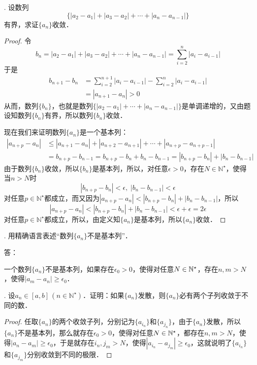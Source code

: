 . 设数列
\begin{equation}
    \{|a_2-a_1|+|a_3-a_2|+\cdots+|a_n-a_{n-1}|\}
\end{equation}
有界，求证$\{a_n\}$收敛．
\begin{proof}
令
\begin{equation}
    b_n = |a_2-a_1|+|a_3-a_2|+\cdots+|a_n-a_{n-1}| =\sum_{i=2}^n |a_{i}-a_{i-1}|
\end{equation}
于是
\begin{align}
    b_{n+1}-b_n &= \sum_{i=2}^{n+1} |a_i - a_{i-1}| -\sum_{i=2}^{n} |a_i-a_{i-1}| \\
    &= |a_{n+1}-a_{n}| > 0
\end{align}
从而，数列$\{b_n\}$，也就是数列$\{|a_2-a_1|+\cdots+|a_{n}-a_{n-1}|\}$是单调递增的，又由题设知数列$\{b_n\}$有界，所以数列$\{b_n\}$收敛．

\noindent 现在我们来证明数列$\{a_n\}$是一个基本列：
\begin{align}
    |a_{n+p}-a_n| &\leq |a_{n+1}-a_n|+|a_{n+2}-a_{n+1}|+\cdots+|a_{n+p}-a_{n+p-1}| \\
    &= b_{n+p} - b_{n-1} = b_{n+p} - b_n + b_{n} - b_{n-1} = |b_{n+p}-b_n|+|b_n-b_{n-1}|
\end{align}
由于数列$\{b_n\}$收敛，所以$\{b_n\}$是基本列，所以，对任意$\epsilon > 0$，存在$N\in\mathbb{N}^\star$，使得当$n > N$时
\begin{equation}
    |b_{n+p}-b_n|<\epsilon, \; |b_n-b_{n-1}|<\epsilon
\end{equation}
对任意$p \in \mathbb{N}^\star$都成立，而又因为$|a_{n+p}-a_n|<|b_{n+p} - b_n|+|b_{n}-b_{n-1}|$，所以
\begin{equation}
    |a_{n+p}-a_n|<|b_{n+p}-b_n|+|b_n-b_{n-1}|<\epsilon+\epsilon=2\epsilon
\end{equation}
对任意$p\in\mathbb{N}^\star$都成立，所以，由定义知$\{a_n\}$是基本列，所以$\{a_n\}$收敛．
\end{proof}
. 用精确语言表述``数列$\{a_n\}$不是基本列''．

\noindent 答：

\noindent 一个数列$\{ a_n \}$不是基本列，如果存在$\epsilon_0 > 0$，使得对任意$N \in \mathbb{N}^\star$，存在$n, m > N$，使得$|a_m - a_n| \geq \epsilon_0$．

. 设$a_n \in [a,b]\,(n\in\mathbb{N}^\star)$．证明：如果$\{a_n\}$发散，则$\{a_n\}$必有两个子列收敛于不同的数．
\begin{proof}
任取$\{ a_n \}$的两个收敛子列，分别记为$\{ a_{i_n} \}$和$\{ a_{j_n} \}$，由于$\{ a_n \}$发散，所以$\{ a_n \}$不是基本列，那么就存在$\epsilon_0 > 0$，使得对任意$N \in \mathbb{N}^\star$，都存在$n, m > N$，使得$|a_n - a_m| \geq \epsilon_0$，于是就存在$i_n, j_m > N$，使得$|a_{i_n} - a_{j_m}| \geq \epsilon_0$，这就说明了$\{ a_{i_n} \}$和$\{ a_{j_m} \}$分别收敛到不同的极限．
\end{proof}

